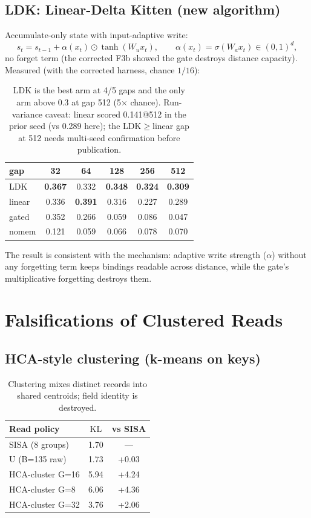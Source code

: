 \documentclass[11pt]{article}
\newcommand{\sisa}{SISA}
\newcommand{\kl}{\mathrm{KL}}
\begin{document}
\subsection{LDK: Linear-Delta Kitten (new algorithm)}
Accumulate-only state with input-adaptive write:
\begin{equation}
s_t = s_{t-1} + \alpha(x_t) \odot \tanh(W_u x_t),\qquad
\alpha(x_t) = \sigma(W_a x_t) \in (0,1)^d,
\label{eq:ldk}
\end{equation}
no forget term (the corrected F3b showed the gate destroys distance
capacity). Measured (with the corrected harness, chance $1/16$):
\begin{table}[H]\centering\small
\begin{tabular}{lccccc}
\toprule
gap & 32 & 64 & 128 & 256 & 512 \\
\midrule
LDK & \textbf{0.367} & 0.332 & \textbf{0.348} & \textbf{0.324} & \textbf{0.309} \\
linear & 0.336 & \textbf{0.391} & 0.316 & 0.227 & 0.289 \\
gated & 0.352 & 0.266 & 0.059 & 0.086 & 0.047 \\
nomem & 0.121 & 0.059 & 0.066 & 0.078 & 0.070 \\
\bottomrule
\end{tabular}
\caption{LDK is the best arm at 4/5 gaps and the only arm above 0.3 at
gap 512 (5$\times$ chance). Run-variance caveat: linear scored 0.141@512
in the prior seed (vs 0.289 here); the LDK$\ge$linear gap at 512 needs
multi-seed confirmation before publication.}
\end{table}
The result is consistent with the mechanism: adaptive write strength
($\alpha$) without any forgetting term keeps bindings readable across
distance, while the gate's multiplicative forgetting destroys them.

\section{Falsifications of Clustered Reads}
\label{sec:fals}
\subsection{HCA-style clustering (k-means on keys)}
\begin{table}[H]\centering\small
\begin{tabular}{lcc}
\toprule
Read policy & $\kl$ & vs \sisa{} \\
\midrule
\sisa{} (8 groups) & 1.70 & --- \\
U (B=135 raw) & 1.73 & +0.03 \\
HCA-cluster G=16 & 5.94 & +4.24 \\
HCA-cluster G=8 & 6.06 & +4.36 \\
HCA-cluster G=32 & 3.76 & +2.06 \\
\bottomrule
\end{tabular}
\caption{Clustering mixes distinct records into shared centroids;
field identity is destroyed.}
\end{table}
\end{document}
